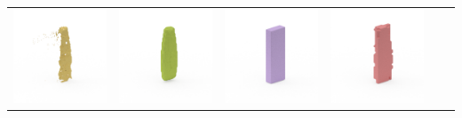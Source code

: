\documentclass[10pt,onecolumn,letterpaper]{article}
\begin{document}
\begin{tabular}{cccccc}
\includegraphics[height=\turnheight, clip=true, trim=60 30 30 5]{vo5_extra_body_volumizing_shampoo_NP2_216_visible_pixels_view_0.png} &
\includegraphics[height=\turnheight, clip=true, trim=60 30 30 5]{vo5_extra_body_volumizing_shampoo_NP2_216_gt_view_0.png} &
\includegraphics[height=\turnheight, clip=true, trim=60 30 30 5]{vo5_extra_body_volumizing_shampoo_NP2_216_bb_view_0.png} &
\includegraphics[height=\turnheight, clip=true, trim=60 30 30 5]{vo5_extra_body_volumizing_shampoo_NP2_216_zheng_view_0.png} &

\end{tabular}
\end{document}
